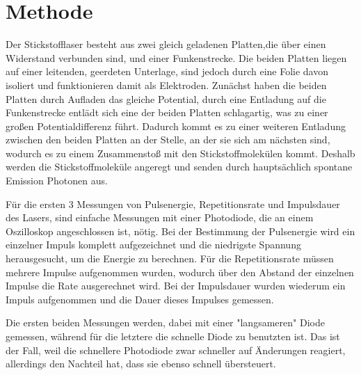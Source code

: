 \documentclass[
	a4paper,
	12pt,
	pagesize,
	ngerman
]{scrartcl}
\begin{document}
\section{Methode}
Der Stickstofflaser besteht aus zwei gleich geladenen Platten,die über einen Widerstand verbunden sind, und einer Funkenstrecke. Die beiden Platten liegen auf einer leitenden, geerdeten Unterlage, sind jedoch durch eine Folie davon isoliert und funktionieren damit als Elektroden. Zunächst haben die beiden Platten durch Aufladen das gleiche Potential, durch eine Entladung auf die Funkenstrecke entlädt sich eine der beiden Platten schlagartig, was zu einer großen Potentialdifferenz führt. Dadurch kommt es zu einer weiteren Entladung zwischen den beiden Platten an der Stelle, an der sie sich am nächsten sind, wodurch es zu einem Zusammenstoß mit den Stickstoffmolekülen kommt. Deshalb werden die Stickstoffmoleküle angeregt und senden durch hauptsächlich spontane Emission Photonen aus. %

Für die ersten 3 Messungen von Pulsenergie, Repetitionsrate und Impulsdauer des Lasers, sind einfache Messungen mit einer Photodiode, die an einem Oszilloskop angeschlossen ist, nötig.
Bei der Bestimmung der Pulsenergie wird ein einzelner Impuls komplett aufgezeichnet und die niedrigste Spannung herausgesucht, um die Energie zu berechnen. 
Für die Repetitionsrate müssen mehrere Impulse aufgenommen wurden, wodurch über den Abstand der einzelnen Impulse die Rate ausgerechnet wird.
Bei der Impulsdauer wurden wiederum ein Impuls aufgenommen und die Dauer dieses Impulses gemessen.

Die ersten beiden Messungen werden, dabei mit einer "langsameren" Diode gemessen, während für die letztere die schnelle Diode zu benutzten ist. Das ist der Fall, weil die schnellere Photodiode zwar schneller auf Änderungen reagiert, allerdings den Nachteil hat, dass sie ebenso schnell übersteuert.
\end{document}
